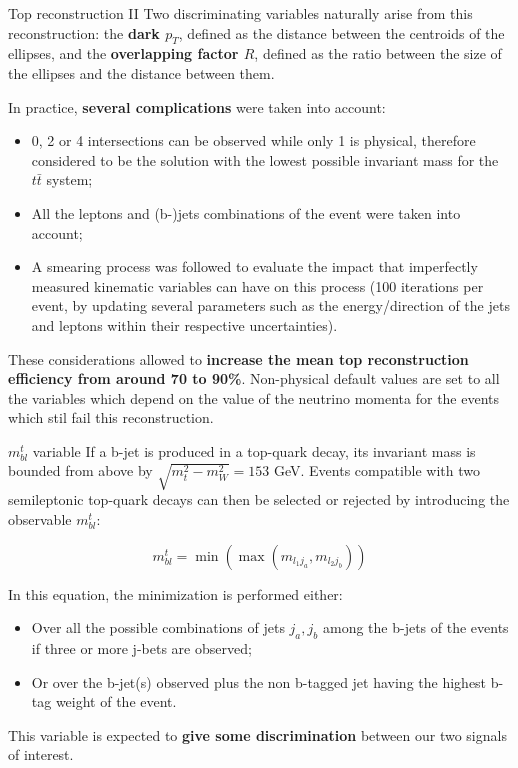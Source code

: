 \documentclass[8pt]{beamer}
\begin{document}
\begin{frame}{Top reconstruction II}
\justifying
Two discriminating variables naturally arise from this reconstruction: the \textbf{dark $p_T$}, defined as the distance between the centroids of the ellipses, and the \textbf{overlapping factor $R$}, defined as the ratio between the size of the ellipses and the distance between them. \vfill

In practice, \textbf{several complications} were taken into account:
\begin{itemize}
\justifying
\item 0, 2 or 4 intersections can be observed while only 1 is physical, therefore considered to be the solution with the lowest possible invariant mass for the $t \bar t$ system;
\item All the leptons and (b-)jets combinations of the event were taken into account;
\item A \alert{smearing process} was followed to evaluate the impact that imperfectly measured kinematic variables can have on this process (100 iterations per event, by updating several parameters such as the energy/direction of the jets and leptons within their respective uncertainties).
\end{itemize} \vfill

These considerations allowed to \textbf{increase the mean top reconstruction efficiency from around 70 to 90\%}. Non-physical default values are set to all the variables which depend on the value of the neutrino momenta for the events which stil fail this reconstruction. \vfill
\end{frame}

\begin{frame}{$m_{bl}^t$ variable}
\justifying
If a b-jet is produced in a top-quark decay, its invariant mass is bounded from above by $\sqrt{m_t^2 - m_{W}^2} = 153$ GeV. Events compatible with two semileptonic top-quark decays can then be selected or rejected by introducing the observable $m_{bl}^t$: \vfill

\begin{equation*}
m_{bl}^t = \min \left (\max(m_{l_1 j_a}, m_{l_2 j_b}) \right)
\end{equation*} \vfill

In this equation, the minimization is performed either:
\begin{itemize}
\justifying
\item Over all the possible combinations of jets {$j_a, j_b$} among the b-jets of the events if three or more j-bets are observed;
\item Or over the b-jet(s) observed plus the non b-tagged jet having the highest b-tag weight of the event.
\end{itemize} \vfill 

This variable is expected to \textbf{give some discrimination} between our two signals of interest. \vfill
\end{frame}
\end{document}
